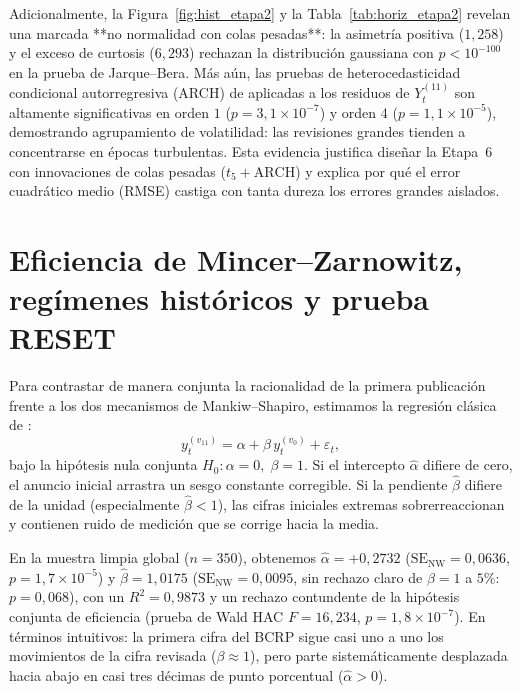 \documentclass[12pt,letterpaper]{article}
\begin{document}
Adicionalmente, la Figura~\ref{fig:hist_etapa2} y la Tabla~\ref{tab:horiz_etapa2} revelan una marcada **no normalidad con colas pesadas**: la asimetría positiva (\(1{,}258\)) y el exceso de curtosis (\(6{,}293\)) rechazan la distribución gaussiana con \(p < 10^{-100}\) en la prueba de Jarque--Bera. Más aún, las pruebas de heterocedasticidad condicional autorregresiva (ARCH) de \textcite{engle1982} aplicadas a los residuos de \(Y_t^{(11)}\) son altamente significativas en orden \(1\) (\(p = 3{,}1\times 10^{-7}\)) y orden \(4\) (\(p = 1{,}1\times 10^{-5}\)), demostrando agrupamiento de volatilidad: las revisiones grandes tienden a concentrarse en épocas turbulentas. Esta evidencia justifica diseñar la Etapa~6 con innovaciones de colas pesadas (\(t_5 + \text{ARCH}\)) y explica por qué el error cuadrático medio (RMSE) castiga con tanta dureza los errores grandes aislados.

\section{Eficiencia de Mincer--Zarnowitz, regímenes históricos y prueba RESET}

Para contrastar de manera conjunta la racionalidad de la primera publicación frente a los dos mecanismos de Mankiw--Shapiro, estimamos la regresión clásica de \textcite{mincer1969}:
\begin{equation}
  y_t^{(v_{11})} = \alpha + \beta\, y_t^{(v_0)} + \varepsilon_t,
  \label{eq:mz}
\end{equation}
bajo la hipótesis nula conjunta \(H_0: \alpha = 0,\; \beta = 1\). Si el intercepto \(\hat{\alpha}\) difiere de cero, el anuncio inicial arrastra un sesgo constante corregible. Si la pendiente \(\hat{\beta}\) difiere de la unidad (especialmente \(\hat{\beta} < 1\)), las cifras iniciales extremas sobrerreaccionan y contienen ruido de medición que se corrige hacia la media.

En la muestra limpia global (\(n=350\)), obtenemos \(\hat{\alpha} = +0{,}2732\) (\(\text{SE}_{\text{NW}} = 0{,}0636\), \(p = 1{,}7\times 10^{-5}\)) y \(\hat{\beta} = 1{,}0175\) (\(\text{SE}_{\text{NW}} = 0{,}0095\), sin rechazo claro de \(\beta=1\) a \(5\%\): \(p = 0{,}068\)), con un \(R^2 = 0{,}9873\) y un rechazo contundente de la hipótesis conjunta de eficiencia (prueba de Wald HAC \(F = 16{,}234\), \(p = 1{,}8\times 10^{-7}\)). En términos intuitivos: la primera cifra del BCRP sigue casi uno a uno los movimientos de la cifra revisada (\(\beta \approx 1\)), pero parte sistemáticamente desplazada hacia abajo en casi tres décimas de punto porcentual (\(\hat{\alpha} > 0\)).
\end{document}
